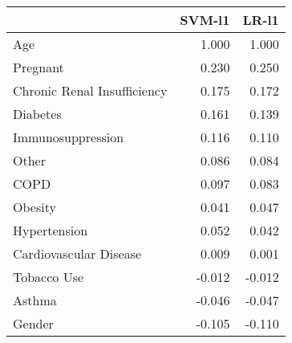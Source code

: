 \begin{tabular}{lrr}
\toprule
{} &  SVM-l1 &  LR-l1 \\
\midrule
Age                         &   1.000 &  1.000 \\
Pregnant                    &   0.230 &  0.250 \\
Chronic Renal Insufficiency &   0.175 &  0.172 \\
Diabetes                    &   0.161 &  0.139 \\
Immunosuppression           &   0.116 &  0.110 \\
Other                       &   0.086 &  0.084 \\
COPD                        &   0.097 &  0.083 \\
Obesity                     &   0.041 &  0.047 \\
Hypertension                &   0.052 &  0.042 \\
Cardiovascular Disease      &   0.009 &  0.001 \\
Tobacco Use                 &  -0.012 & -0.012 \\
Asthma                      &  -0.046 & -0.047 \\
Gender                      &  -0.105 & -0.110 \\
\bottomrule
\end{tabular}
